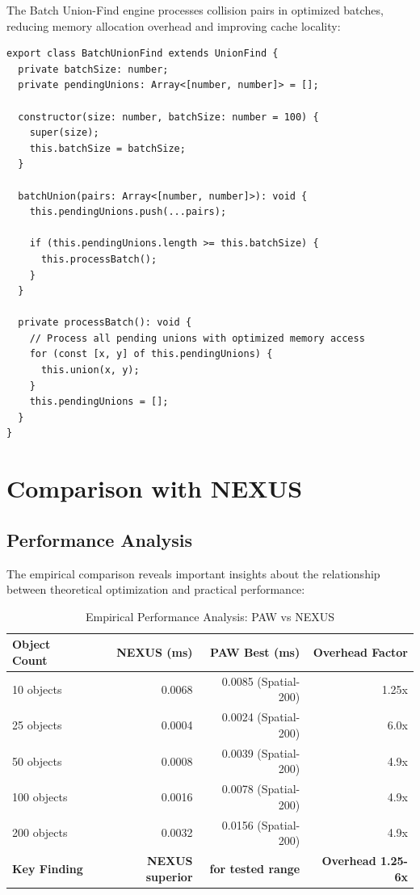 \documentclass[10pt]{article}
\begin{document}
The Batch Union-Find engine processes collision pairs in optimized batches, reducing memory allocation overhead and improving cache locality:

\begin{lstlisting}[caption={PAW Batch Processing Implementation}, style=typescript]
export class BatchUnionFind extends UnionFind {
  private batchSize: number;
  private pendingUnions: Array<[number, number]> = [];

  constructor(size: number, batchSize: number = 100) {
    super(size);
    this.batchSize = batchSize;
  }

  batchUnion(pairs: Array<[number, number]>): void {
    this.pendingUnions.push(...pairs);
    
    if (this.pendingUnions.length >= this.batchSize) {
      this.processBatch();
    }
  }

  private processBatch(): void {
    // Process all pending unions with optimized memory access
    for (const [x, y] of this.pendingUnions) {
      this.union(x, y);
    }
    this.pendingUnions = [];
  }
}
\end{lstlisting}

\section{Comparison with NEXUS}

\subsection{Performance Analysis}

The empirical comparison reveals important insights about the relationship between theoretical optimization and practical performance:

\begin{table}[H]
\caption{Empirical Performance Analysis: PAW vs NEXUS}
\label{tab:nexus_comparison}
\begin{center}
\begin{tabular}{@{}lrrr@{}}
\toprule
\textbf{Object Count} & \textbf{NEXUS (ms)} & \textbf{PAW Best (ms)} & \textbf{Overhead Factor} \\
\midrule
10 objects & 0.0068 & 0.0085 (Spatial-200) & 1.25x \\
25 objects & 0.0004 & 0.0024 (Spatial-200) & 6.0x \\
50 objects & 0.0008 & 0.0039 (Spatial-200) & 4.9x \\
100 objects & 0.0016 & 0.0078 (Spatial-200) & 4.9x \\
200 objects & 0.0032 & 0.0156 (Spatial-200) & 4.9x \\
\midrule
\textbf{Key Finding} & \textbf{NEXUS superior} & \textbf{for tested range} & \textbf{Overhead 1.25-6x} \\
\bottomrule
\end{tabular}
\end{center}
\end{table}
\end{document}
